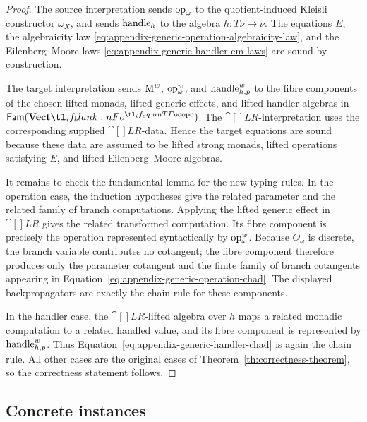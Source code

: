 \documentclass[11pt,a4paper]{article}
\theoremstyle{definition}
\theoremstyle{remark}
\providecommand{\Fam}[1]{\mathsf{Fam}(#1)}
\begin{document}
\begin{proof}
  The source interpretation sends \(\opn[b]{op}_{\omega}\) to the
  quotient-induced Kleisli constructor \(\omega_X\), and sends
  \(\opn[b]{handle}_{h}\) to the algebra \(h:T\nu\to\nu\).  The equations \(E\), the algebraicity law
  \eqref{eq:appendix-generic-operation-algebraicity-law}, and the
  Eilenberg--Moore laws \eqref{eq:appendix-generic-handler-em-laws} are sound by
  construction.

  The target interpretation sends \(\opn[b]{M}^{w}\),
  \(\opn[b]{op}^{w}_{\omega}\), and \(\opn[b]{handle}^{w}_{h,p}\) to the fibre
  components of the chosen lifted monads, lifted generic effects, and lifted
  handler algebras in \(\Fam{\Vect[o]}\).  The \(\cat[]{LR}\)-interpretation uses
  the corresponding supplied \(\cat[]{LR}\)-data.  Hence the target equations are
  sound because these data are assumed to be lifted strong monads, lifted
  operations satisfying \(E\), and lifted Eilenberg--Moore algebras.

  It remains to check the fundamental lemma for the new typing rules.  In the
  operation case, the induction hypotheses give the related parameter and the
  related family of branch computations.  Applying the lifted generic effect
  in \(\cat[]{LR}\) gives the related transformed computation.  Its fibre
  component is precisely the operation represented syntactically by
  \(\opn[b]{op}^{w}_{\omega}\).  Because \(O_{\omega}\) is discrete, the branch
  variable contributes no cotangent; the fibre component therefore produces only
  the parameter cotangent and the finite family of branch cotangents appearing in
  Equation~\eqref{eq:appendix-generic-operation-chad}.  The displayed
  backpropagators are exactly the chain rule for these components.

  In the handler case, the \(\cat[]{LR}\)-lifted algebra over \(h\) maps a
  related monadic computation to a related handled value, and its fibre component
  is represented by \(\opn[b]{handle}^{w}_{h,p}\).  Thus
  Equation~\eqref{eq:appendix-generic-handler-chad} is again the chain rule.  All
  other cases are the original cases of Theorem~\ref{th:correctness-theorem}, so
  the correctness statement follows.
\end{proof}


\subsection{Concrete instances}
\label{sec:appendix-additional-effects-examples}
\end{document}

